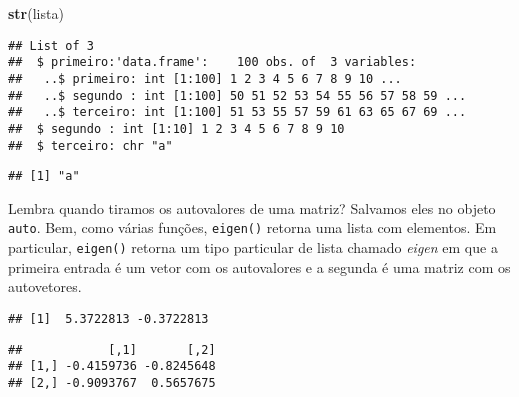 \documentclass[]{article}
\newenvironment{Shaded}{\begin{snugshade}}{\end{snugshade}}
\newcommand{\KeywordTok}[1]{\textcolor[rgb]{0.13,0.29,0.53}{\textbf{#1}}}
\newcommand{\NormalTok}[1]{#1}
\newcommand{\OperatorTok}[1]{\textcolor[rgb]{0.81,0.36,0.00}{\textbf{#1}}}
\begin{document}
\begin{Shaded}
\begin{Highlighting}[]
\KeywordTok{str}\NormalTok{(lista)}
\end{Highlighting}
\end{Shaded}

\begin{verbatim}
## List of 3
##  $ primeiro:'data.frame':    100 obs. of  3 variables:
##   ..$ primeiro: int [1:100] 1 2 3 4 5 6 7 8 9 10 ...
##   ..$ segundo : int [1:100] 50 51 52 53 54 55 56 57 58 59 ...
##   ..$ terceiro: int [1:100] 51 53 55 57 59 61 63 65 67 69 ...
##  $ segundo : int [1:10] 1 2 3 4 5 6 7 8 9 10
##  $ terceiro: chr "a"
\end{verbatim}

\begin{Shaded}
\end{Shaded}

\begin{verbatim}
## [1] "a"
\end{verbatim}

Lembra quando tiramos os autovalores de uma matriz? Salvamos eles no
objeto \texttt{auto}. Bem, como várias funções, \texttt{eigen()} retorna
uma lista com elementos. Em particular, \texttt{eigen()} retorna um tipo
particular de lista chamado \emph{eigen} em que a primeira entrada é um
vetor com os autovalores e a segunda é uma matriz com os autovetores.

\begin{Shaded}
\end{Shaded}

\begin{verbatim}
## [1]  5.3722813 -0.3722813
\end{verbatim}

\begin{Shaded}
\end{Shaded}

\begin{verbatim}
##            [,1]       [,2]
## [1,] -0.4159736 -0.8245648
## [2,] -0.9093767  0.5657675
\end{verbatim}
\end{document}

